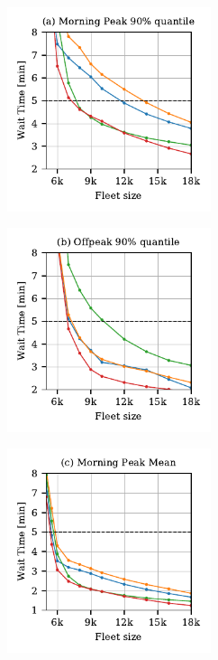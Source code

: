 \begin{figure}
\centering
\begin{subfigure}{0.5\textwidth}
  \centering
  \includegraphics[width=2.35in]{figures/revision/rev_waiting_time_q90.pdf}
\end{subfigure}%
\begin{subfigure}{0.5\textwidth}
  \centering
  \includegraphics[width=2.35in]{figures/revision/rev_waiting_time_q90_offpeak.pdf}
\end{subfigure}
\begin{subfigure}{0.5\textwidth}
  \centering
  \includegraphics[width=2.35in]{figures/revision/rev_waiting_time_mean.pdf}
\end{subfigure}%

\end{figure}

